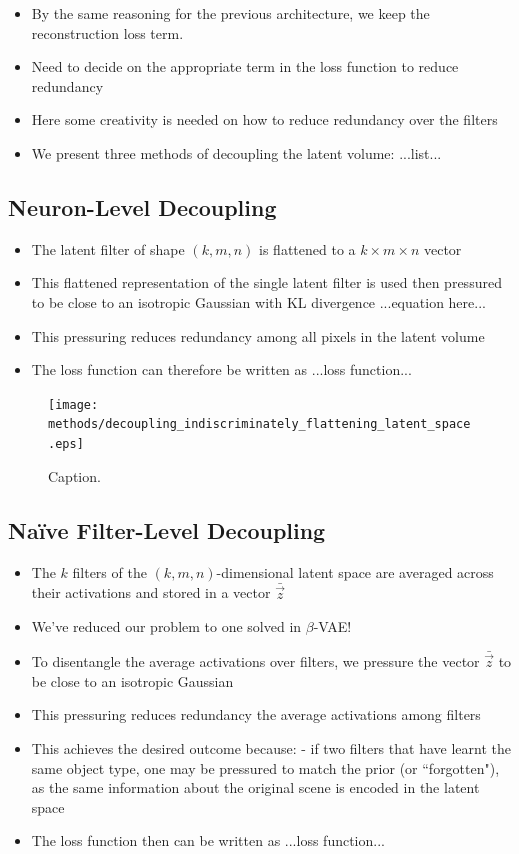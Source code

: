 \begin{itemize}
\item By the same reasoning for the previous architecture, we keep the reconstruction loss term. 
\item Need to decide on the appropriate term in the loss function to reduce redundancy
\item Here some creativity is needed on how to reduce redundancy over the filters
\item We present three methods of decoupling the latent volume: ...list...
\end{itemize}

%
%
\subsection{Neuron-Level Decoupling}
\begin{itemize}
\item The latent filter of shape $(k, m, n)$ is flattened to a $k \times m \times n$ vector
\item This flattened representation of the single latent filter is used then pressured to be close to an isotropic Gaussian with KL divergence ...equation here...
\item This pressuring reduces redundancy among all pixels in the latent volume
\item The loss function can therefore be written as ...loss function...
\end{itemize}

\begin{figure}[H]
\centering
\captionsetup{justification=centering}
\texttt{[image: methods/decoupling\_indiscriminately\_flattening\_latent\_space.eps]}
\caption{Caption.}
\label{fig:decoupling_indiscriminately_flattening_latent_space}
\end{figure}

%
%
\subsection{Na{\"i}ve Filter-Level Decoupling}
\begin{itemize}
\item The $k$ filters of the $(k, m, n)$-dimensional latent space are averaged across their activations and stored in a vector $\bar{\vec{z}}$
\item We've reduced our problem to one solved in $\beta$-VAE!
\item To disentangle the average activations over filters, we pressure the vector $\bar{\vec{z}}$ to be close to an isotropic Gaussian
\item This pressuring reduces redundancy the average activations among filters
\item This achieves the desired outcome because: - if two filters that have learnt the same object type, one may be pressured to match the prior (or ``forgotten"), as the same information about the original scene is encoded in the latent space
\item The loss function then can be written as ...loss function...
\end{itemize}

